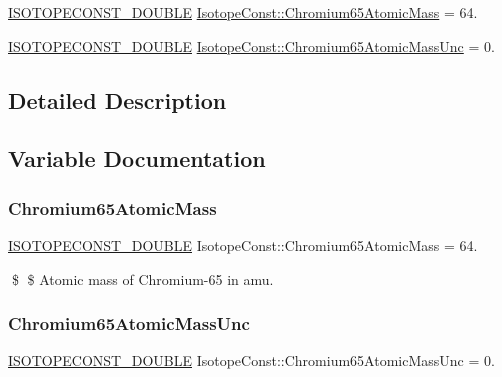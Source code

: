 \begin{DoxyCompactItemize}
\item 
\mbox{\hyperlink{group___isotope_const-_macros_ga8f45a7272ce02c0b4c65c44636ed719a}{I\+S\+O\+T\+O\+P\+E\+C\+O\+N\+S\+T\+\_\+\+D\+O\+U\+B\+LE}} \mbox{\hyperlink{group___isotope_const-_chromium-_cr65_ga87f7b6ee7b92d171445de10b62330be8}{Isotope\+Const\+::\+Chromium65\+Atomic\+Mass}} = 64.
\item 
\mbox{\hyperlink{group___isotope_const-_macros_ga8f45a7272ce02c0b4c65c44636ed719a}{I\+S\+O\+T\+O\+P\+E\+C\+O\+N\+S\+T\+\_\+\+D\+O\+U\+B\+LE}} \mbox{\hyperlink{group___isotope_const-_chromium-_cr65_ga857159fe55c88632047b436cb083875e}{Isotope\+Const\+::\+Chromium65\+Atomic\+Mass\+Unc}} = 0.
\end{DoxyCompactItemize}


\subsection{Detailed Description}


\subsection{Variable Documentation}
\mbox{\label{group___isotope_const-_chromium-_cr65_ga87f7b6ee7b92d171445de10b62330be8}} 
\subsubsection{\texorpdfstring{Chromium65\+Atomic\+Mass}{Chromium65AtomicMass}}
{\footnotesize\ttfamily \mbox{\hyperlink{group___isotope_const-_macros_ga8f45a7272ce02c0b4c65c44636ed719a}{I\+S\+O\+T\+O\+P\+E\+C\+O\+N\+S\+T\+\_\+\+D\+O\+U\+B\+LE}} Isotope\+Const\+::\+Chromium65\+Atomic\+Mass = 64.}

\$ \$ Atomic mass of Chromium-\/65 in amu. \mbox{\label{group___isotope_const-_chromium-_cr65_ga857159fe55c88632047b436cb083875e}} 
\subsubsection{\texorpdfstring{Chromium65\+Atomic\+Mass\+Unc}{Chromium65AtomicMassUnc}}
{\footnotesize\ttfamily \mbox{\hyperlink{group___isotope_const-_macros_ga8f45a7272ce02c0b4c65c44636ed719a}{I\+S\+O\+T\+O\+P\+E\+C\+O\+N\+S\+T\+\_\+\+D\+O\+U\+B\+LE}} Isotope\+Const\+::\+Chromium65\+Atomic\+Mass\+Unc = 0.}

